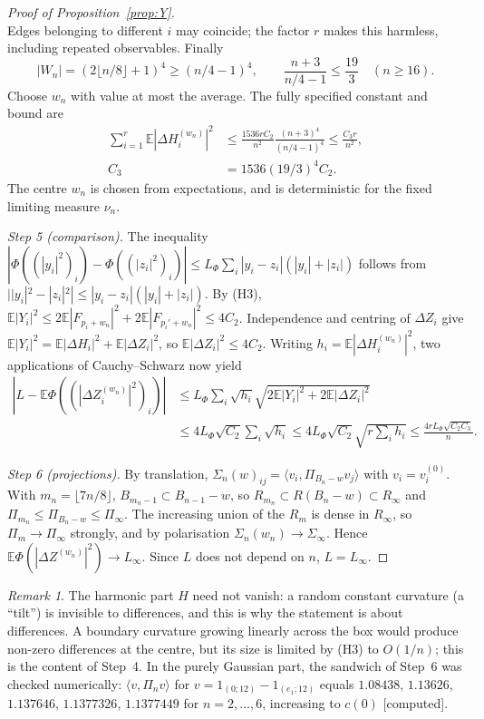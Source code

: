 \documentclass[11pt,a4paper]{article}
\theoremstyle{plain}
\theoremstyle{definition}
\theoremstyle{remark}
\newtheorem{remark}[theorem]{Remark}
\numberwithin{equation}{section}
\newcommand{\E}{\mathbb{E}}
\newcommand{\st}[1]{\textsf{[#1]}}
\begin{document}
\begin{proof}[Proof of Proposition~\ref{prop:Y}]
\[\]
Edges belonging to different $i$ may coincide; the factor $r$ makes this harmless, including repeated observables.
Finally
\[
|W_n|=(2\lfloor n/8\rfloor+1)^4\ge(n/4-1)^4,
\qquad \frac{n+3}{n/4-1}\le\frac{19}{3}\quad(n\ge16).
\]
Choose $w_n$ with value at most the average. The fully specified constant and bound are
\begin{equation*}\tag{Y.5}\label{eq:Y-harmonic-average}
\begin{aligned}
\sum_{i=1}^r\E|\Delta H_i^{(w_n)}|^2
&\le\frac{1536rC_2}{n^2}\frac{(n+3)^4}{(n/4-1)^4}
\le\frac{C_3r}{n^2},\\
C_3&=1536(19/3)^4C_2.
\end{aligned}
\end{equation*}
The centre $w_n$ is chosen from expectations, and is deterministic for the fixed limiting measure $\nu_n$.

\emph{Step 5 (comparison).} The inequality
$|\Phi((|y_i|^2)_i)-\Phi((|z_i|^2)_i)|\le L_\Phi\sum_i|y_i-z_i|(|y_i|+|z_i|)$
follows from $||y_i|^2-|z_i|^2|\le|y_i-z_i|(|y_i|+|z_i|)$.
By (H3), $\E|Y_i|^2\le2\E|F_{p_i+w_n}|^2+2\E|F_{p_i'+w_n}|^2\le4C_2$.
Independence and centring of $\Delta Z_i$ give
$\E|Y_i|^2=\E|\Delta H_i|^2+\E|\Delta Z_i|^2$, so $\E|\Delta Z_i|^2\le4C_2$.
Writing $h_i=\E|\Delta H_i^{(w_n)}|^2$, two applications of Cauchy--Schwarz now yield
\[
\begin{split}
|L-\E\Phi((|\Delta Z_i^{(w_n)}|^2)_i)|
&\le L_\Phi\sum_i\sqrt{h_i}
       \sqrt{2\E|Y_i|^2+2\E|\Delta Z_i|^2}\\
&\le4L_\Phi\sqrt{C_2}\sum_i\sqrt{h_i}
 \le4L_\Phi\sqrt{C_2}\sqrt{r\sum_i h_i}
 \le\frac{4rL_\Phi\sqrt{C_2C_3}}{n}.
\end{split}
\]

\emph{Step 6 (projections).} By translation, $\Sigma_n(w)_{ij}=\langle v_i,\Pi_{B_n-w}v_j\rangle$ with $v_i=v^{(0)}_i$. With
$m_n=\lfloor7n/8\rfloor$, $B_{m_n-1}\subset B_{n-1}-w$, so $R_{m_n}\subset R(B_n-w)\subset R_\infty$ and $\Pi_{m_n}\le\Pi_{B_n-w}\le\Pi_\infty$.
The increasing union of the $R_m$ is dense in $R_\infty$, so $\Pi_m\to\Pi_\infty$ strongly, and by polarisation $\Sigma_n(w_n)\to\Sigma_\infty$.
Hence $\E\Phi(|\Delta Z^{(w_n)}|^2)\to L_\infty$. Since $L$ does not depend on $n$, $L=L_\infty$.
\end{proof}

\begin{remark}
The harmonic part $H$ need not vanish: a random constant curvature (a ``tilt'') is invisible to differences, and this is why the
statement is about differences. A boundary curvature growing linearly across the box would produce non-zero differences at the centre,
but its size is limited by (H3) to $O(1/n)$; this is the content of Step~4. In the purely Gaussian part, the sandwich of Step~6 was
checked numerically: $\langle v,\Pi_nv\rangle$ for $v=1_{(0;12)}-1_{(e_1;12)}$ equals $1.08438$, $1.13626$, $1.137646$, $1.1377326$,
$1.1377449$ for $n=2,\dots,6$, increasing to $c(0)$ \st{computed}.
\end{remark}
\end{document}
